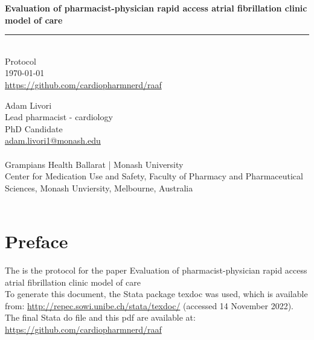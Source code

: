\documentclass[11pt]{article}
\newcommand{\thedate}{\today}
\begin{document}
\begin{titlepage}
  \begin{flushright}
        \Huge
		\textbf{Evaluation of pharmacist-physician rapid access atrial fibrillation clinic model of care}
\color{violet}
\rule{16cm}{2mm} \\
\Large
\color{black}
Protocol \\
\thedate \\
\color{blue}
\url{https://github.com/cardiopharmnerd/raaf} \\
\color{black}
		\vfill
	\end{flushright}
		\Large
\noindent
Adam Livori \\
Lead pharmacist - cardiology \\
PhD Candidate \\
\color{blue}
\href{mailto:adam.livori1@monash.edu}{adam.livori1@monash.edu} \\
\color{black}
\\
Grampians Health Ballarat | Monash University
\\
Center for Medication Use and Safety, Faculty of Pharmacy and Pharmaceutical Sciences, Monash Unviersity, Melbourne, Australia \\
\\
\end{titlepage}

\pagebreak
\tableofcontents
\pagebreak

\section{Preface}


The is the protocol for the paper Evaluation of pharmacist-physician rapid access atrial fibrillation clinic model of care\\
To generate this document, the Stata package texdoc \cite{Jann2016Stata} was used, which is  available from: \color{blue} \url{http://repec.sowi.unibe.ch/stata/texdoc/} \color{black} (accessed 14 November 2022).  The final Stata do file and this pdf are available at: \color{blue} \url{https://github.com/cardiopharmnerd/raaf} \color{black} 

\pagebreak
\end{document}
